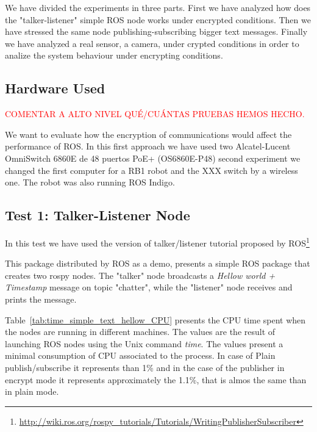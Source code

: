 \documentclass[journal,twoside]{JoPhA}
\begin{document}
We have divided the experiments in three parts. First we have analyzed how does the "talker-listener" simple ROS node works under encrypted conditions. Then we have stressed the same node publishing-subscribing bigger text messages. Finally we have analyzed a real sensor, a camera, under crypted conditions in order to analize the system behaviour under encrypting conditions.  

\subsection{Hardware Used}

\textcolor{red}{COMENTAR A ALTO NIVEL QU\'E/CU\'ANTAS PRUEBAS HEMOS HECHO.}

We want to evaluate how the encryption of communications would affect the performance of ROS.
In this first approach we have used two  Alcatel-Lucent OmniSwitch 6860E de 48 puertos PoE+ (OS6860E-P48)
second experiment we changed the first computer for a RB1 robot and the XXX switch by a wireless one. The robot was also running ROS Indigo.



\subsection{Test 1: Talker-Listener Node}

In this test we have used the version of talker/listener tutorial proposed by ROS\footnote{\url{http://wiki.ros.org/rospy_tutorials/Tutorials/WritingPublisherSubscriber}}

This package distributed by ROS as a demo, presents a simple ROS package that creates two rospy nodes. The "talker" node broadcasts a {\em Hellow world + Timestamp} message on topic "chatter", while the "listener" node receives and prints the message.



Table~\ref{tab:time_simple_text_hellow_CPU} presents the CPU time spent when the nodes are running in different machines.  The values are the result of launching ROS nodes using the Unix command {\em time}. The values present a minimal consumption of CPU associated to the process. In  case of Plain publish/subscribe it represents than 1\% and in the case of the publisher in encrypt mode it represents approximately the 1.1\%, that is almos the same than in plain mode.
\end{document}
